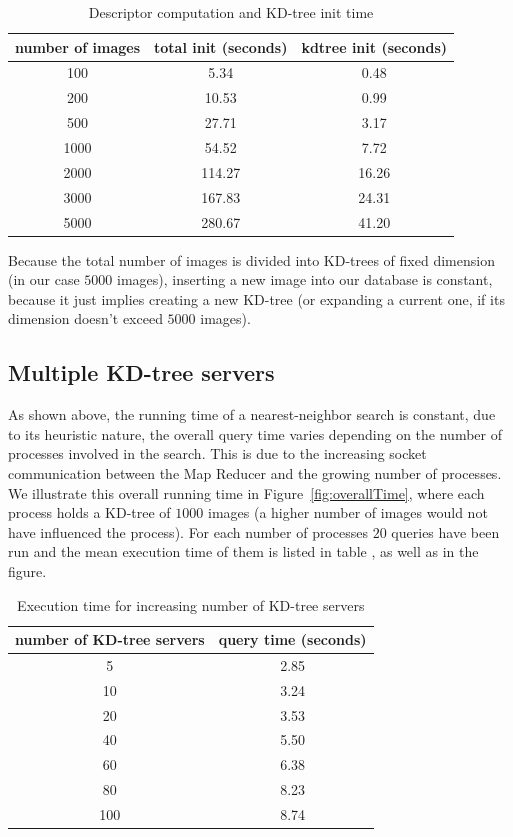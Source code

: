 \begin{table}[H]
\centering
\begin{tabular} {c | c | c}
	number of images & total init (seconds) & kdtree init (seconds) \\
	\hline
	100 & 5.34 & 0.48 \\
	200 & 10.53 & 0.99 \\
	500 & 27.71 & 3.17 \\
	1000 & 54.52 & 7.72 \\
	2000 & 114.27 & 16.26 \\
	3000 & 167.83 & 24.31 \\
	5000 & 280.67 & 41.20 \\
\end{tabular}
\caption{Descriptor computation and KD-tree init time}
\end{table}

Because the total number of images is divided into KD-trees of fixed dimension (in our case $5000$ images), inserting a new image into our database is constant, because it just implies creating a new KD-tree (or expanding a current one, if its dimension doesn't exceed $5000$ images).\\

\subsection{Multiple KD-tree servers}

As shown above, the running time of a nearest-neighbor search is constant, due to its heuristic nature, the overall query time varies depending on the number of processes involved in the search.
This is due to the increasing socket communication between the Map Reducer and the growing number of processes.
We illustrate this overall running time in Figure~\ref{fig:overallTime}, where each process holds a KD-tree of $1000$ images (a higher number of images would not have influenced the process). For each number of processes $20$ queries have been run and the mean execution time of them is listed in table , as well as in the figure.\\

\begin{table}[H]
\centering
\begin{tabular} {c | c}
	number of KD-tree servers & query time (seconds) \\
	\hline
	5 & 2.85\\
	10 & 3.24\\
	20 & 3.53\\
	40 & 5.50\\
	60 & 6.38\\
	80 & 8.23\\
	100 & 8.74\\
\end{tabular}
\caption{Execution time for increasing number of KD-tree servers}
\label{table:processTime}
\end{table}

